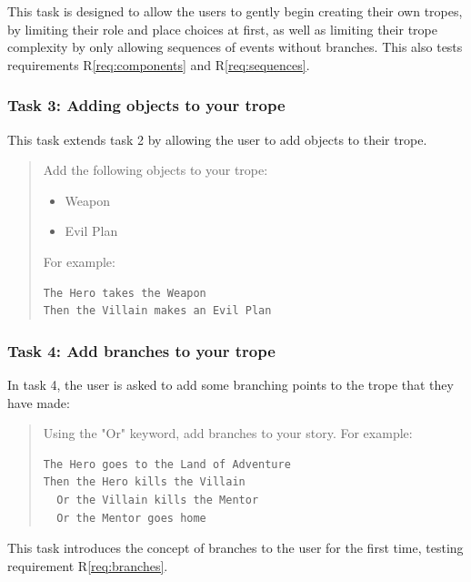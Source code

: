 \documentclass[11pt]{report}
\begin{document}
This task is designed to allow the users to gently begin creating their own
tropes, by limiting their role and place choices at first, as well as limiting
their trope complexity by only allowing sequences of events without branches.
This also tests requirements R\ref{req:components} and R\ref{req:sequences}.

\subsubsection*{Task 3: Adding objects to your trope}
\label{sec:org9cb2b36}

This task extends task 2 by allowing the user to add objects to their trope.

\begin{framed}
\begin{quote}
Add the following objects to your trope:

\begin{itemize}
\item Weapon
\item Evil Plan
\end{itemize}

For example:

\begin{verbatim}
The Hero takes the Weapon
Then the Villain makes an Evil Plan
\end{verbatim}
\end{quote}
\end{framed}

\subsubsection*{Task 4: Add branches to your trope}
\label{sec:org80c0de6}

In task 4, the user is asked to add some branching points to the trope that they
have made:

\begin{framed}
\begin{quote}
Using the "Or" keyword, add branches to your story. For example:


\begin{verbatim}
The Hero goes to the Land of Adventure
Then the Hero kills the Villain
  Or the Villain kills the Mentor
  Or the Mentor goes home
\end{verbatim}
\end{quote}
\end{framed}

This task introduces the concept of branches to the user for the first time,
testing requirement R\ref{req:branches}.
\end{document}
